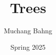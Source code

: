 \documentclass{article}
\begin{document}
\title{Trees}
\author{Muchang Bahng}
\date{Spring 2025}

\maketitle
\tableofcontents
\pagebreak 










\end{document}
